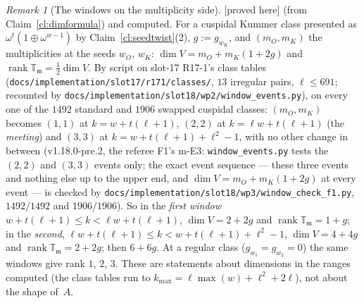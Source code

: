 \documentclass[11pt]{article}
\theoremstyle{remark}
\newtheorem{remark}[theorem]{Remark}
\DeclareMathOperator{\rank}{rank}
\newcommand{\T}{\mathbb{T}}
\newcommand{\m}{\mathfrak{m}}
\newcommand{\PROVED}{\textsf{[proved here]}}
\begin{document}
\begin{remark}[The windows on the multiplicity side]\label{rmk:dimwindows}
\PROVED{} (from Claim~\ref{cl:dimformula}) and computed. For a cuspidal Kummer class presented as $\omega^{t}(1\oplus\omega^{w-1})$ by
Claim~\ref{cl:seedtwist}(2), $g:=g_{w_K}$, and $(m_O,m_K)$ the multiplicities at the seeds $w_O$, $w_K$: $\dim V=m_O+m_K(1+2g)$ and $\rank\T_\m=\frac12\dim V$.
By script on slot-17 R17-1's class tables (\texttt{docs/implementation/slot17/r171/classes/}, $13$ irregular pairs, $\ell\le691$; recounted by
\texttt{docs/implementation/slot18/wp2/window\_events.py}), on every one of the $1492$ standard and $1906$ swapped cuspidal classes: $(m_O,m_K)$ becomes $(1,1)$ at
$k=w+t(\ell+1)$, $(2,2)$ at $k=\ell w+t(\ell+1)$ (the \emph{meeting}) and $(3,3)$ at $k=w+t(\ell+1)+\ell^{2}-1$, with no other change in between
(v1.18.0-pre.2, the referee F1's m-E3: \texttt{window\_events.py} tests the $(2,2)$ and $(3,3)$ events only; the exact event sequence --- these three events and
nothing else up to the upper end, and $\dim V=m_O+m_K(1+2g)$ at every event --- is checked by \texttt{docs/implementation/slot18/wp3/window\_check\_f1.py},
$1492/1492$ and $1906/1906$). So in the
\emph{first window} $w+t(\ell+1)\le k<\ell w+t(\ell+1)$, $\dim V=2+2g$ and $\rank\T_\m=1+g$; in the \emph{second}, $\ell w+t(\ell+1)\le k<w+t(\ell+1)+\ell^{2}-1$,
$\dim V=4+4g$ and $\rank\T_\m=2+2g$; then $6+6g$. At a regular class ($g_{w_1}=g_{w_2}=0$) the same windows give rank $1$, $2$, $3$. These are statements
about dimensions in the ranges computed (the class tables run to $k_{\max}=\ell\max(w)+\ell^{2}+2\ell$), not about the shape of~$A$.
\end{remark}
\end{document}
